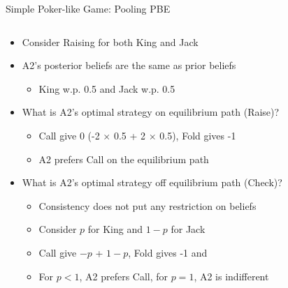 \documentclass[11pt,aspectratio=169,handout]{beamer}
\begin{document}
  
  \begin{frame}{Simple Poker-like Game: Pooling PBE}
   \begin{columns}
    \begin{column}{0.6\textwidth}
     \begin{itemize}[<+->] \scriptsize
     \setlength{\itemsep}{0.7em}
      \item Consider Raising for both King and Jack
      \item A2's posterior beliefs are the same as prior beliefs
      \begin{itemize}\scriptsize
       \item King w.p. 0.5 and Jack w.p. 0.5
      \end{itemize}
      \item What is A2's optimal strategy on equilibrium path (Raise)?
      \begin{itemize}\scriptsize
       \item Call give 0 (-2 $\times$ 0.5 + 2 $\times$ 0.5), Fold gives -1
       \item A2 prefers Call on the equilibrium path
      \end{itemize}
      \item What is A2's optimal strategy off equilibrium path (Check)?
      \begin{itemize}\scriptsize
       \item Consistency does not put any restriction on beliefs
       \item Consider $p$ for King and $1-p$ for Jack
       \item Call give $-p$ + $1-p$, Fold gives -1 and 
       \item For $p<1$, A2 prefers Call, for $p=1$, A2 is indifferent
      \end{itemize}
     \end{itemize}
    \end{column}
    \begin{column}{0.4\textwidth}   
     \begin{center}
\end{center}
\end{column}
\end{columns}
\end{frame}
\end{document}
